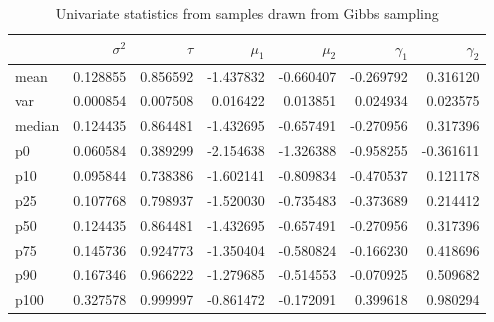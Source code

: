 \documentclass{article}
\begin{document}
\begin{table}[H]
  \begin{center}
    \begin{tabular}{lrrrrrr}
      &$\sigma^2$ & $\tau$ & $\mu_1$ & $\mu_2$ & $\gamma_1$ & $\gamma_2$ \\
      \midrule
      mean   &  0.128855 &  0.856592 & -1.437832 & -0.660407 & -0.269792 &  0.316120 \\
      var    &  0.000854 &  0.007508 &  0.016422 &  0.013851 &  0.024934 &  0.023575 \\
      median &  0.124435 &  0.864481 & -1.432695 & -0.657491 & -0.270956 &  0.317396 \\
      p0     &  0.060584 &  0.389299 & -2.154638 & -1.326388 & -0.958255 & -0.361611 \\
      p10    &  0.095844 &  0.738386 & -1.602141 & -0.809834 & -0.470537 &  0.121178 \\
      p25    &  0.107768 &  0.798937 & -1.520030 & -0.735483 & -0.373689 &  0.214412 \\
      p50    &  0.124435 &  0.864481 & -1.432695 & -0.657491 & -0.270956 &  0.317396 \\
      p75    &  0.145736 &  0.924773 & -1.350404 & -0.580824 & -0.166230 &  0.418696 \\
      p90    &  0.167346 &  0.966222 & -1.279685 & -0.514553 & -0.070925 &  0.509682 \\
      p100   &  0.327578 &  0.999997 & -0.861472 & -0.172091 &  0.399618 &  0.980294 \\
      \bottomrule
      \end{tabular}
  \end{center}
  \caption{\label{tab:gibbs_univar} Univariate statistics from samples drawn from Gibbs sampling}
\end{table}
\end{document}
